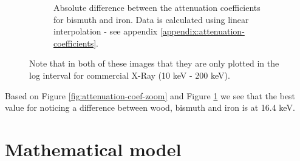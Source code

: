 \documentclass{article}
\begin{document}
\begin{figure}[H]
\begin{subfigure}[b]{0.49\textwidth}
        \caption{\small Absolute difference between the attenuation coefficients for bismuth and iron. Data is calculated using linear interpolation - see appendix \ref{appendix:attenuation-coefficients}.}
        \label{fig:diff-attenuation-coef-bismuth-iron}
    \end{subfigure}
    \caption{\small Note that in both of these images that they are only plotted in the log interval for commercial X-Ray (10 keV - 200 keV).}
    \label{fig:both-attenuation-coeff-plots}
\end{figure}


Based on Figure \ref{fig:attenuation-coef-zoom} and Figure \ref{fig:diff-attenuation-coef-bismuth-iron} we see that the best value for noticing a difference between wood, bismuth and iron is at 16.4 keV. 

\section{Mathematical model}
\end{document}
